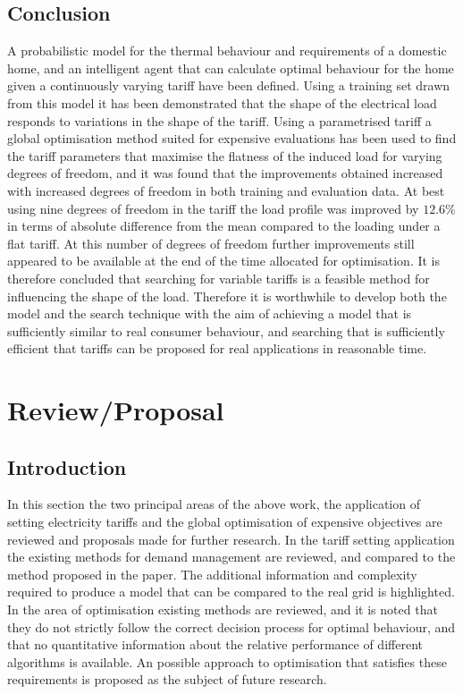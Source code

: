\documentclass[a4paper, 10 pt, conference]{ieeeconf}  %
\begin{document}
\subsection{Conclusion}
A probabilistic model for the thermal behaviour and requirements of a domestic home, and an intelligent agent that can calculate optimal behaviour for the home given a continuously varying tariff have been defined. Using a training set drawn from this model it has been demonstrated that the shape of the electrical load responds to variations in the shape of the tariff. Using a parametrised tariff a global optimisation method suited for expensive evaluations has been used to find the tariff parameters that maximise the flatness of the induced load for varying degrees of freedom, and it was found that the improvements obtained increased with increased degrees of freedom in both training and evaluation data. At best using nine degrees of freedom in the tariff the load profile was improved by $12.6\%$ in terms of absolute difference from the mean compared to the loading under a flat tariff. At this number of degrees of freedom further improvements still appeared to be available at the end of the time allocated for optimisation. It is therefore concluded that searching for variable tariffs is a feasible method for influencing the shape of the load. Therefore it is worthwhile to develop both the model and the search technique with the aim of achieving a model that is sufficiently similar to real consumer behaviour, and searching that is sufficiently efficient that tariffs can be proposed for real applications in reasonable time. 







\onecolumn
\large
\section{Review/Proposal}
\doublespacing
\subsection{Introduction}
In this section the two principal areas of the above work, the application of setting electricity tariffs and the global optimisation of expensive objectives are reviewed and proposals made for further research.
In the tariff setting application the existing methods for demand management are reviewed, and compared to the method proposed in the paper. The additional information and complexity required to produce a model that can be compared to the real grid is highlighted.
In the area of optimisation existing methods are reviewed, and it is noted that they do not strictly follow the correct decision process for optimal behaviour, and that no quantitative information about the relative performance of different algorithms is available. An possible approach to optimisation that satisfies these requirements is proposed as the subject of future research.
\end{document}
